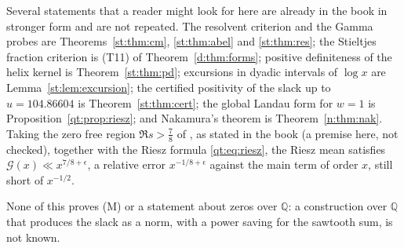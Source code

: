 Several statements that a reader might look for here are already in the book in stronger form and are not repeated. The resolvent criterion and the Gamma probes are Theorems~\ref{st:thm:cm}, \ref{st:thm:abel} and \ref{st:thm:res}; the Stieltjes fraction criterion is (T11) of Theorem~\ref{d:thm:forms}; positive definiteness of the helix kernel is Theorem~\ref{st:thm:pd}; excursions in dyadic intervals of $\log x$ are Lemma~\ref{st:lem:excursion}; the certified positivity of the slack up to $u=104.86604$ is Theorem~\ref{st:thm:cert}; the global Landau form for $w=1$ is Proposition~\ref{qt:prop:riesz}; and Nakamura's theorem is Theorem~\ref{n:thm:nak}. Taking the zero free region $\Re s>\frac78$ of \cite{OAI26a}, as stated in the book (a premise here, not checked), together with the Riesz formula \eqref{qt:eq:riesz}, the Riesz mean satisfies $\mathcal G(x)\ll x^{7/8+\epsilon}$, a relative error $x^{-1/8+\epsilon}$ against the main term of order $x$, still short of $x^{-1/2}$.

None of this proves (M) or a statement about zeros over $\mathbb Q$: a construction over $\mathbb Q$ that produces the slack as a norm, with a power saving for the sawtooth sum, is not known.
